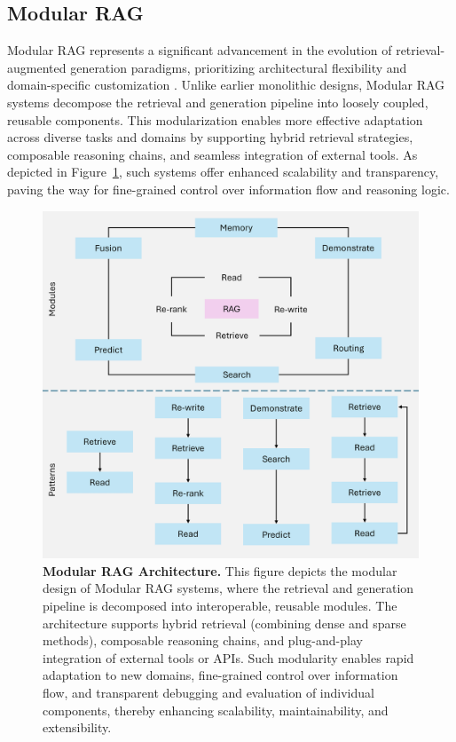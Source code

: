 \subsection{Modular RAG }

Modular RAG\cite{gao2024retrievalaugmented} represents a significant advancement in the evolution of retrieval-augmented generation paradigms, prioritizing architectural flexibility and domain-specific customization \cite{lewis2020retrieval,shi2023replug}. Unlike earlier monolithic designs, Modular RAG systems decompose the retrieval and generation pipeline into loosely coupled, reusable components. This modularization enables more effective adaptation across diverse tasks and domains by supporting hybrid retrieval strategies, composable reasoning chains, and seamless integration of external tools. As depicted in Figure~\ref{fig:modular_rag_architecture}, such systems offer enhanced scalability and transparency, paving the way for fine-grained control over information flow and reasoning logic.

\begin{figure}[h!]
    \centering
    \includegraphics[width=0.92\linewidth]{images/fig_5.png}
    \caption{
        \textbf{Modular RAG Architecture.}
        This figure depicts the modular design of Modular RAG systems, where the retrieval and generation pipeline is decomposed into interoperable, reusable modules. The architecture supports hybrid retrieval (combining dense and sparse methods), composable reasoning chains, and plug-and-play integration of external tools or APIs. Such modularity enables rapid adaptation to new domains, fine-grained control over information flow, and transparent debugging and evaluation of individual components, thereby enhancing scalability, maintainability, and extensibility.
    }
    \label{fig:modular_rag_architecture}
\end{figure}

